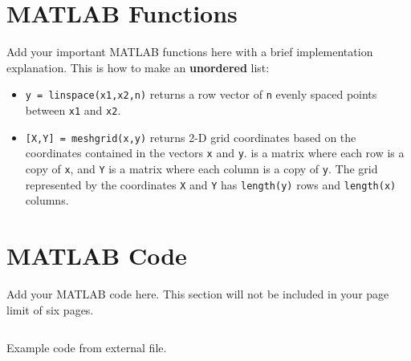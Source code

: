 \documentclass{article}
\begin{document}
\begin{appendices}

\section{MATLAB Functions}
Add your important MATLAB functions here with a brief implementation explanation. This is how to make an \textbf{unordered} list:
\begin{itemize}
    \item \texttt{y = linspace(x1,x2,n)} returns a row vector of \texttt{n} evenly spaced points between \texttt{x1} and \texttt{x2}. 
    \item \texttt{[X,Y] = meshgrid(x,y)} returns 2-D grid coordinates based on the coordinates contained in the vectors \texttt{x} and \texttt{y}.  is a matrix where each row is a copy of \texttt{x}, and \texttt{Y} is a matrix where each column is a copy of \texttt{y}. The grid represented by the coordinates \texttt{X} and \texttt{Y} has \texttt{length(y)} rows and \texttt{length(x)} columns.  
\end{itemize}

\section{MATLAB Code}
Add your MATLAB code here. This section will not be included in your page limit of six pages.

\begin{listing}[h]
\inputminted{matlab}{example.m}
\caption{Example code from external file.}
\label{listing:examplecode}
\end{listing}

\end{appendices}
\end{document}
